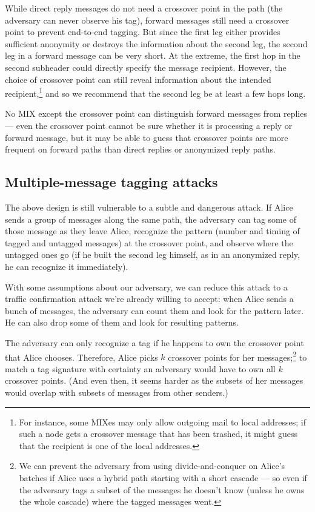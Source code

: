 \documentclass{llncs}
\begin{document}
While direct reply messages do not need a crossover point in the path
(the adversary can never observe his tag), forward messages still need a
crossover point to prevent end-to-end tagging. But since the first leg
either provides sufficient anonymity or destroys the information about
the second leg, the second leg in a forward message can be very short.
At the extreme, the first hop in the second subheader could directly
specify the message recipient. However, the choice of crossover point
can still reveal information about the intended recipient,\footnote{For instance,
some MIXes may only allow outgoing mail to local addresses; if such a
node gets a crossover message that has been trashed, it might guess
that the recipient is one of the local addresses.} and so we recommend
that the second leg be at least a few hops long.

No MIX except the crossover point can distinguish forward messages from
replies --- even the crossover point cannot be sure whether it is processing
a reply or forward message, but it may be able to guess that crossover
points are more frequent on forward paths than direct replies or
anonymized reply paths.

\subsection{Multiple-message tagging attacks}
\label{subsec:multi-tagging}

The above design is still vulnerable to a subtle and dangerous
attack. If Alice sends a group of messages along the same path, the
adversary can tag some of those message as they leave Alice, recognize
the pattern (number and timing of tagged and untagged messages) at the
crossover point, and observe where the untagged ones go (if he built
the second leg himself, as in an anonymized reply, he can recognize
it immediately).

With some assumptions about our adversary, we can reduce
this attack to a traffic confirmation attack we're already willing to
accept: when Alice sends a bunch of messages, the adversary can count
them and look for the pattern later. He can also drop some of them and
look for resulting patterns.

The adversary can only recognize a tag if he happens to own the crossover
point that Alice chooses.
Therefore, Alice picks $k$ crossover points for her
messages;\footnote{
  We can prevent the adversary from using divide-and-conquer on Alice's
  batches if Alice uses a hybrid path starting with a short cascade ---
  so even if the adversary tags a subset of the messages he doesn't know
  (unless he owns the whole cascade) where the tagged messages went.
}
to match a tag signature with certainty an adversary would
have to own all $k$ crossover points.  (And even then, it seems harder
as the subsets of her messages would overlap with subsets of
messages from other senders.)
\end{document}

